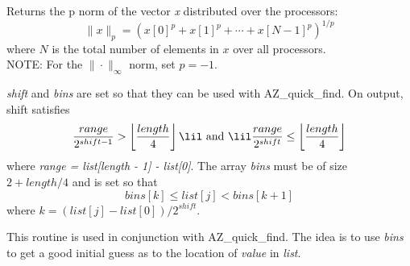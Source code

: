


\vspace{2em}
{ \hrulefill}
\vspace{1em}

Returns the p norm of the vector {\it x\/} distributed over the processors:
\[
        \|x\|_p = (x[0]^p + x[1]^p + \cdots + x[N-1]^p)^{1/p}
\]
where $N$ is the total number of elements in $x$ over all processors.\\
NOTE: For the $\| \cdot \|_{\infty}$ norm, set $p = -1$.

\vspace{2em}
{ \hrulefill}
\vspace{1em}





\vspace{2em}
{ \hrulefill}
\vspace{1em}

{\it shift\/} and {\it bins\/} are set so that they can be used with
{\sf AZ\_quick\_find}. On output, shift satisfies
\[
    \frac{range}{2^{shift-1}} > \left \lfloor \frac{length}{4} \right \rfloor
\lil \mbox{ and } \lil
    \frac{range}{2^{shift}} \le \left \lfloor \frac{length}{4} \right \rfloor
\]
where {\it range = list[length - 1] - list[0]\/}. The array {\it bins\/} must
be of size $2 + length/4 $ and is set so that
\[
bins[k] \leq list[j] < bins[k+1]
\]
where $k = (list[j] - list[0])/2^{shift}$.

This routine is used in conjunction with {\sf AZ\_quick\_find}. The idea is to
use {\it bins\/} to get a good initial guess as to the location of {\it
  value\/} in {\it list\/}.

